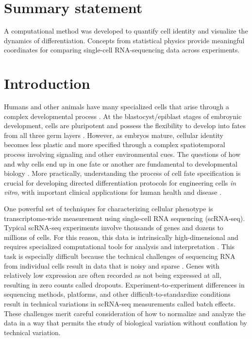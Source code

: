 \documentclass[vruler,JEB]{COB}%
\begin{document}

\section{Summary statement}
A computational method was developed to quantify cell identity and visualize the dynamics of differentiation. Concepts from statistical physics provide meaningful coordinates for comparing single-cell RNA-sequencing data across experiments.

\section{Introduction}
Humans and other animals have many specialized cells that arise through a complex developmental process  \citep{zeng_what_2022}. At the blastocyst/epiblast stages of embroynic development, cells are pluripotent and possess the flexibility to develop into fates from all three germ layers \citep{Wolpert_2019}. However, as embryos mature, cellular identity becomes less plastic and more specified through a complex spatiotemporal process involving signaling and other environmental cues. The questions of how and why cells end up in one fate or another are fundamental to developmental biology \citep{stephenson_intercellular_2012, zhu2020principles, rand2021geometry}. More practically, understanding the process of cell fate specification is crucial for developing directed differentiation protocols for engineering cells \emph{in vitro}, with important clinical applications for human health and disease \citep{rossant_impact_2011, rowe2019induced, basil2020cellular}.

One powerful set of techniques for characterizing cellular phenotype is transcriptome-wide measurement using single-cell RNA sequencing (scRNA-seq). Typical scRNA-seq experiments involve thousands of genes and dozens to millions of cells. For this reason, this data is intrinsically high-dimensional and requires specialized computational tools for analysis and interpretation \citep{zhu2020principles, setty2019characterization, schiebinger2019optimal}. This task is especially difficult because the technical challenges of sequencing RNA from individual cells result in data that is noisy and sparse \citep{hicks2018missing, lahnemann_eleven_2020, argelaguet2021computational}. Genes with relatively low expression are often recorded as not being expressed at all, resulting in zero counts called dropouts. Experiment-to-experiment differences in sequencing methods, platforms, and other difficult-to-standardize conditions result in technical variations in scRNA-seq measurements called batch effects. These challenges merit careful consideration of how to normalize and analyze the data in a way that permits the study of biological variation without conflation by technical variation.
\end{document}
